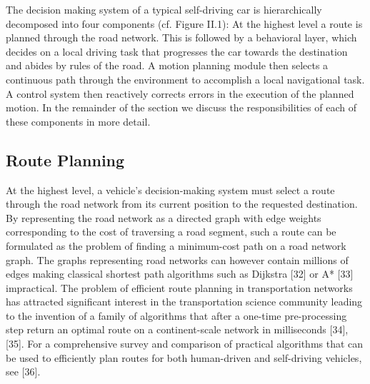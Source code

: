 The decision making system of a typical self-driving car is hierarchically decomposed into four components (cf. Figure II.1): At the highest level a route is planned through the road network. This is followed by a behavioral layer, which decides on a local driving task that progresses the car towards the destination and abides by rules of the road. A motion planning module then selects a continuous path through the environment to accomplish a local navigational task. A control system then reactively corrects errors in the execution of the planned motion. In the remainder of the section we discuss the responsibilities of each of these components in more detail.

\subsection{Route Planning}
At the highest level, a vehicle’s decision-making system must select a route through the road network from its current position to the requested destination. By representing the road network as a directed graph with edge weights corresponding to the cost of traversing a road segment, such a route can be formulated as the problem of finding a minimum-cost path on a road network graph. The graphs representing road networks can however contain millions of edges making classical shortest path algorithms such as Dijkstra [32] or A* [33] impractical. The problem of efficient route planning in transportation networks has attracted significant interest in the transportation science community leading to the invention of a family of algorithms that after a one-time pre-processing step return an optimal route on a continent-scale network in milliseconds [34], [35]. For a comprehensive survey and comparison of practical algorithms that can be used to efficiently plan routes for both human-driven and self-driving vehicles, see [36].

